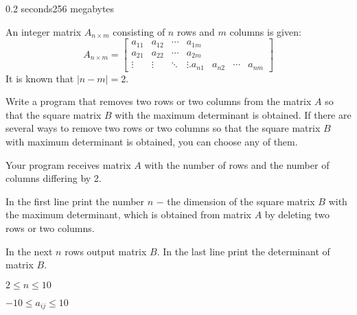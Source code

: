 \begin{problem}{}{}{}{0.2 seconds}{256 megabytes}

An integer matrix $A_{n\times m}$ consisting of $n$ rows and $m$ columns is given:
$$
A_{n\times m} = \begin{bmatrix}
a_{11} & a_{12} & \cdots & a_{1m} \\
a_{21} & a_{22} & \cdots & a_{2m} \\
\vdots & \vdots & \ddots & \vdots.
a_{n1} & a_{n2} & \cdots & a_{nm}
\end{bmatrix}
$$
It is known that $|n - m| = 2$.

Write a program that removes two rows or two columns from the matrix $A$ so that the square matrix $B$ with the maximum determinant is obtained.
If there are several ways to remove two rows or two columns so that the square matrix $B$ with maximum determinant is obtained, you can choose any of them.


\InputFile
Your program receives matrix $A$ with the number of rows and the number of columns differing by 2.

\OutputFile
In the first line print the number $n$ $-$ the dimension of the square matrix $B$ with the maximum determinant, 
which is obtained from matrix $A$ by deleting two rows or two columns. 

In the next $n$ rows output matrix $B$.
In the last line print the determinant of matrix $B$.

\Constraints

$2 \le n \le 10$

$-10 \le a_{ij} \le 10$

\Examples
\begin{example}
%
%
\end{example}

\end{problem}

